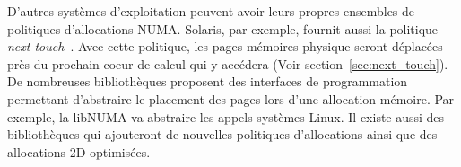 D'autres systèmes d'exploitation peuvent avoir leurs propres ensembles de politiques d'allocations NUMA.
%
Solaris, par exemple, fournit aussi la politique {\em next-touch}~\cite{next_touch}.
%
Avec cette politique, les pages mémoires physique seront déplacées près du prochain coeur de calcul qui y accédera (Voir section~\ref{sec:next_touch}).
%
De nombreuses bibliothèques proposent des interfaces de programmation permettant d'abstraire le placement des pages lors d'une allocation mémoire.
%
Par exemple, la libNUMA\cite{libnuma} va abstraire les appels systèmes Linux.
%
Il existe aussi des bibliothèques qui ajouteront de nouvelles politiques d'allocations ainsi que des allocations 2D optimisées\cite{minas}.
